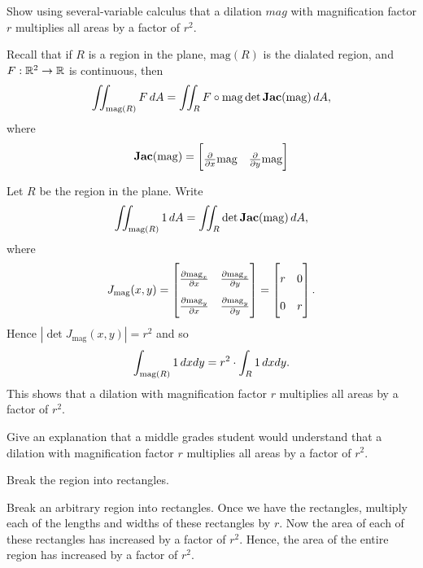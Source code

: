 \documentclass[newpage,hints,handout,12pt,noauthor,nooutcomes]{ximera}
\begin{document}
\begin{problem}
Show using several-variable calculus that a dilation $mag$ with
magnification factor $r$ multiplies all areas by a factor of $r^{2}$.
\begin{hint}
Recall that if $R$ is a region in the plane, $\mathrm{mag}(R)$ is the
dialated region, and $F:\mathbb R^2\to\mathbb R$ is continuous, then
\[
\iint_{\mathrm{mag}(R)} F  \,d A= \iint_{R} F\circ \mathrm{mag} \det \mathbf{Jac}(\mathrm{mag})  \,d A,
\]
where
\[
\jac(\mathrm{mag}) = 
\begin{bmatrix}
\frac{\partial}{\partial{x}}\mathrm{mag} &\frac{\partial}{\partial{y}}\mathrm{mag}
\end{bmatrix}
\]
\end{hint}
\begin{freeResponse}
Let $R$ be the region in the plane. Write
\[
\iint_{\mathrm{mag}(R)} 1  \,d A = \iint_{R}  \det \mathbf{Jac}(\mathrm{mag}) \,d A,
\]
where
\[
J_\mathrm{mag}(x,y) =
{\renewcommand\arraystretch{2}
\begin{bmatrix}
\pp[\mathrm{mag}_x]{x} & \pp[\mathrm{mag}_x]{y} \\
\pp[\mathrm{mag}_y]{x} & \pp[\mathrm{mag}_y]{y}
\end{bmatrix}} = 
\begin{bmatrix}
r & 0 \\
0 & r
\end{bmatrix}.
\]
Hence $\left|\det J_\mathrm{mag}(x,y)\right| = r^2$ and so 
\[
\int_{\mathrm{mag}(R)} 1  \,d xdy = r^2\cdot \int_R 1\,d xdy.
\]
This shows that a dilation with magnification factor $r$ multiplies
all areas by a factor of $r^{2}$.
\end{freeResponse}
\end{problem}

\begin{problem}
Give an explanation that a middle grades student would understand that
a dilation with magnification factor $r$ multiplies all areas by a
factor of $r^{2}$.
\begin{hint}
Break the region into rectangles. 
\end{hint}
\begin{freeResponse}
Break an arbitrary region into rectangles. Once we have the
rectangles, multiply each of the lengths and widths of these
rectangles by $r$. Now the area of each of these rectangles has
increased by a factor of $r^2$. Hence, the area of the entire region
has increased by a factor of $r^2$.
\end{freeResponse}
\end{problem}
\end{document}

